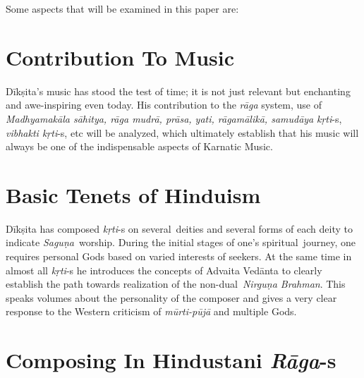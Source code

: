Some aspects that will be examined in this paper are:

\vspace{-.3cm}

\section*{Contribution To Music}

Dīkṣita’s music has stood the test of time; it is not just relevant but enchanting and awe-inspiring even today. His contribution to the \textit{rāga} system, use of \textit{Madhyamakāla sāhitya, rāga mudrā, prāsa, yati, rāgamālikā, samudāya} \textit{kṛti}-s, \textit{vibhakti kṛti}-s, etc will be analyzed, which ultimately establish that his music will always be one of the indispensable aspects of Karnatic Music.

\vspace{-.3cm}

\section*{Basic Tenets of Hinduism}

Dīkṣita has composed \textit{kṛti}-s on several deities and several forms of each deity to indicate \textit{Saguṇa} worship. During the initial stages of one’s spiritual journey, one requires personal Gods based on varied interests of seekers. At the same time in almost all \textit{kṛti}-s he introduces the concepts of Advaita Vedānta to clearly establish the path towards realization of the non-dual \textit{Nirguṇa Brahman}. This speaks volumes about the personality of the composer and gives a very clear response to the Western criticism of \textit{mūrti-pūjā} and multiple Gods.

\vspace{-.3cm}

\section*{Composing In Hindustani \textit{Rāga}-s}

